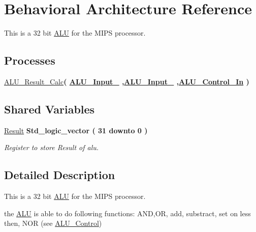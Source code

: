 \hypertarget{class_a_l_u_1_1_behavioral}{\section{\-Behavioral \-Architecture \-Reference}
\label{class_a_l_u_1_1_behavioral}
}


\-This is a 32 bit \hyperlink{class_a_l_u}{\-A\-L\-U} for the \-M\-I\-P\-S processor.  


\*
\*
\subsection*{\-Processes}
 \begin{DoxyCompactItemize}
\item 
\hyperlink{class_a_l_u_1_1_behavioral_a9d398c4f01ad1a21234856b1403845fc}{\-A\-L\-U\-\_\-\-Result\-\_\-\-Calc}{\bfseries  ( {\bfseries {\bfseries \hyperlink{class_a_l_u_ad506dc3c4d5a49b33075dcf2ea057306}{\-A\-L\-U\-\_\-\-Input\-\_}}   ,{\bfseries \hyperlink{class_a_l_u_a657f38dca67063612c1c3d9327260efd}{\-A\-L\-U\-\_\-\-Input\-\_}}  ,{\bfseries \hyperlink{class_a_l_u_a160e9acd866b7a383a28d77c159bd52a}{\-A\-L\-U\-\_\-\-Control\-\_\-\-In}}  } )}
\end{DoxyCompactItemize}
\subsection*{\-Shared \-Variables}
 \begin{DoxyCompactItemize}
\item 
\hyperlink{class_a_l_u_1_1_behavioral_afc4b6c182f9d7ec900d031c30ae7fd43}{\-Result} {\bfseries \-Std\-\_\-logic\-\_\-vector (   31    downto    0  ) } 
\begin{DoxyCompactList}\small\item\em \-Register to store \-Result of alu. \end{DoxyCompactList}\end{DoxyCompactItemize}


\subsection{\-Detailed \-Description}
\-This is a 32 bit \hyperlink{class_a_l_u}{\-A\-L\-U} for the \-M\-I\-P\-S processor. 

the \hyperlink{class_a_l_u}{\-A\-L\-U} is able to do following functions\-: \-A\-N\-D,\-O\-R, add, substract, set on less then, \-N\-O\-R (see \hyperlink{class_a_l_u___control}{\-A\-L\-U\-\_\-\-Control})

